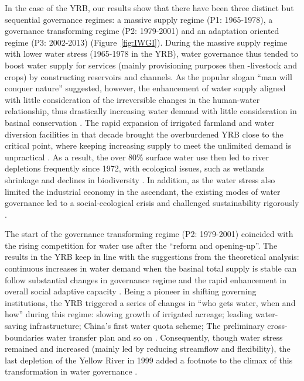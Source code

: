 In the case of the YRB, our results show that there have been three distinct but sequential governance regimes: a massive supply regime (P1: 1965-1978), a governance transforming regime (P2: 1979-2001) and an adaptation oriented regime (P3: 2002-2013) (Figure~\ref{fig:IWGI}).
During the massive supply regime with lower water stress (1965-1978 in the YRB), water governance thus tended to boost water supply for services (mainly provisioning purposes then -livestock and crops) by constructing reservoirs and channels.
As the popular slogan ``man will conquer nature'' suggested, however, the enhancement of water supply aligned with little consideration of the irreversible changes in the human-water relationship, thus drastically increasing water demand with little consideration in basinal conservation
\cite{zhou2020}.
The rapid expansion of irrigated farmland and water diversion facilities in that decade brought the overburdened YRB close to the critical point, where keeping increasing supply to meet the unlimited demand is unpractical \cite{loch2020}.
As a result, the over 80\% surface water use then led to river depletions frequently since 1972, with ecological issues, such as wetlands shrinkage and declines in biodiversity \cite{wang2019c}.
In addition, as the water stress also limited the industrial economy in the ascendant, the existing modes of water governance led to a social-ecological crisis and challenged sustainability rigorously
\cite{wohlfart2016a}.

The start of the governance transforming regime (P2: 1979-2001) coincided with the rising competition for water use after the ``reform and opening-up''.
The results in the YRB keep in line with the suggestions from the theoretical analysis: continuous increases in water demand when the basinal total supply is stable can follow substantial changes in governance regime and the rapid enhancement in overall social adaptive capacity \cite{loch2020}.
Being a pioneer in shifting governing institutions, the YRB triggered a series of changes in ``who gets water, when and how'' during this regime: slowing growth of irrigated acreage; leading water-saving infrastructure; China's first water quota scheme; The preliminary cross-boundaries water transfer plan and so on
\cite{wang2019a,long2020,nickum2021}.
Consequently, though water stress remained and increased (mainly led by reducing streamflow and flexibility), the last depletion of the Yellow River in 1999 added a footnote to the climax of this transformation in water governance \cite{wang2019a}.

